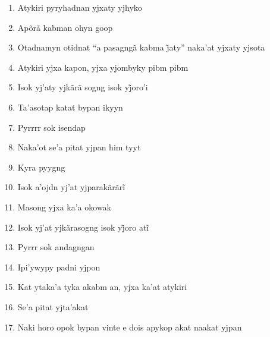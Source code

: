 \begin{enumerate}
 \begin{center}\end{center}

 \item Atykiri pyryhadnan yjxaty yjhyko

 \item Apõrã kabman ohyn goop

 \item Otadnamyn otidnat ``a pasagngã kabma j̃aty'' naka’at yjxaty yjsota

 \item Atykiri yjxa kapon, yjxa yjombyky pibm pibm

 \item Isok yj’aty yjkãrã sogng isok yj̃oro’i

 \begin{center}\end{center}

 \item Ta'asotap katat bypan ikyyn

 \item Pyrrrr sok isendap

 \item Naka'ot se'a pitat yjpan him tyyt

 \item Kyra pyygng

 \item Isok a’ojdn yj’at yjparakãrãrĩ

 \begin{center}\end{center}

 \item Masong yjxa ka'a okowak

 \item Isok yj’at yjkãrasogng isok yj̃oro atĩ

 \item Pyrrr sok andagngan

 \item Ipi'ywypy padni yjpon

 \begin{center}\end{center}

 \item Kat ytaka'a tyka akabm an, yjxa ka'at atykiri

 \item Se'a pitat yjta'akat

 \item Naki horo opok bypan vinte e dois apykop akat naakat yjpan


\end{enumerate}
